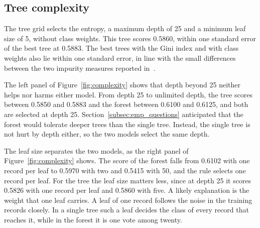 \documentclass[conference,10pt]{IEEEtran}
\begin{document}
\subsection{Tree complexity}
\label{subsec:res_complexity}

The tree grid selects the entropy, a maximum depth of 25 and a minimum leaf
size of 5, without class weights. This tree scores 0.5860, within one standard error of the best tree at
0.5883. The best trees with the Gini index and with class weights also lie
within one standard error, in line with the small differences between the two
impurity measures reported in~\cite{raileanu2004theoretical}.

The left panel of Figure~\ref{fig:complexity} shows that depth beyond 25 neither helps nor harms either model. From depth 25 to unlimited depth, the tree scores
between 0.5850 and 0.5883 and the forest between 0.6100 and 0.6125, and
both are selected at depth 25. Section~\ref{subsec:emp_questions}
anticipated that the forest would tolerate deeper trees than the single
tree. Instead, the single tree is not hurt by depth either, so the two
models select the same depth.

The leaf size separates the two models, as the right panel of Figure~\ref{fig:complexity} shows. The score of the forest falls from
0.6102 with one record per leaf to 0.5970 with two and 0.5415 with 50, and
the rule selects one record per leaf. For the tree the leaf size matters
less, since at depth 25 it scores 0.5826 with one record per leaf and
0.5860 with five. A likely explanation is the weight that one leaf carries.
A leaf of one record follows the noise in the training records closely. In a single tree such a leaf decides
the class of every record that reaches it, while in the forest it is one
vote among twenty.
\end{document}

